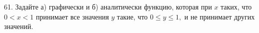 61. Задайте а) графически и б) аналитически функцию, которая при $x$ таких, что $0<x<1$ принимает все значения $y$ такие, что $0\le y\le1,$ и не принимает других значений.\\
